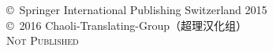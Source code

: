 \documentclass[11pt,fleqn,twoside]{book}
\begin{document}
\noindent \copyright\ Springer International Publishing Switzerland 2015 \\

\noindent \copyright\ 2016 Chaoli-Translating-Group（超理汉化组） \\ %

\noindent \textsc{Not Published}\\ %



\end{document}
